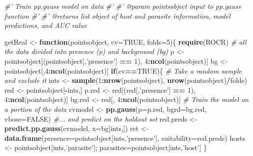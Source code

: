 \documentclass[
]{article}
\newenvironment{Shaded}{\begin{snugshade}}{\end{snugshade}}
\newcommand{\CommentTok}[1]{\textcolor[rgb]{0.56,0.35,0.01}{\textit{#1}}}
\newcommand{\ControlFlowTok}[1]{\textcolor[rgb]{0.13,0.29,0.53}{\textbf{#1}}}
\newcommand{\DataTypeTok}[1]{\textcolor[rgb]{0.13,0.29,0.53}{#1}}
\newcommand{\DecValTok}[1]{\textcolor[rgb]{0.00,0.00,0.81}{#1}}
\newcommand{\KeywordTok}[1]{\textcolor[rgb]{0.13,0.29,0.53}{\textbf{#1}}}
\newcommand{\NormalTok}[1]{#1}
\newcommand{\OperatorTok}[1]{\textcolor[rgb]{0.81,0.36,0.00}{\textbf{#1}}}
\newcommand{\OtherTok}[1]{\textcolor[rgb]{0.56,0.35,0.01}{#1}}
\newcommand{\StringTok}[1]{\textcolor[rgb]{0.31,0.60,0.02}{#1}}
\begin{document}
\begin{Shaded}
\begin{Highlighting}[]
\CommentTok{#' Train pp.gauss model on data}
\CommentTok{#'}
\CommentTok{#' @param pointsobject input to pp.gauss function}
\CommentTok{#' }
\CommentTok{#' @returns list object of host and parasite information, model predictions, and AUC value}

\NormalTok{getReal <-}\StringTok{ }\ControlFlowTok{function}\NormalTok{(pointsobject, }\DataTypeTok{cv=}\OtherTok{TRUE}\NormalTok{, }\DataTypeTok{folds=}\DecValTok{5}\NormalTok{)\{}
  \KeywordTok{require}\NormalTok{(ROCR)}
  \CommentTok{# all the data divided into presence (p) and background (bg)}
\NormalTok{  p <-}\StringTok{ }\NormalTok{pointsobject[(pointsobject[,}\StringTok{'presence'}\NormalTok{] }\OperatorTok{==}\StringTok{ }\DecValTok{1}\NormalTok{), }\DecValTok{4}\OperatorTok{:}\KeywordTok{ncol}\NormalTok{(pointsobject)]}
\NormalTok{  bg <-}\StringTok{ }\NormalTok{pointsobject[,}\DecValTok{4}\OperatorTok{:}\KeywordTok{ncol}\NormalTok{(pointsobject)]}
  \ControlFlowTok{if}\NormalTok{(cv}\OperatorTok{==}\OtherTok{TRUE}\NormalTok{)\{}
        \CommentTok{# Take a random sample and exclude it}
\NormalTok{        ints <-}\StringTok{ }\KeywordTok{sample}\NormalTok{(}\DecValTok{1}\OperatorTok{:}\KeywordTok{nrow}\NormalTok{(pointsobject), }\KeywordTok{nrow}\NormalTok{(pointsobject)}\OperatorTok{/}\NormalTok{folds)}
\NormalTok{        red <-}\StringTok{ }\NormalTok{pointsobject[}\OperatorTok{-}\NormalTok{ints,]}
\NormalTok{        p.red <-}\StringTok{ }\NormalTok{red[(red[,}\StringTok{'presence'}\NormalTok{] }\OperatorTok{==}\StringTok{ }\DecValTok{1}\NormalTok{), }\DecValTok{4}\OperatorTok{:}\KeywordTok{ncol}\NormalTok{(pointsobject)]}
\NormalTok{        bg.red <-}\StringTok{ }\NormalTok{red[, }\DecValTok{4}\OperatorTok{:}\KeywordTok{ncol}\NormalTok{(pointsobject)]}
        \CommentTok{# Train the model on a portion of the data}
\NormalTok{        cvmodel <-}\StringTok{ }\KeywordTok{pp.gauss}\NormalTok{(}\DataTypeTok{p=}\NormalTok{p.red, }\DataTypeTok{bgrd=}\NormalTok{bg.red, }\DataTypeTok{vbose=}\OtherTok{FALSE}\NormalTok{)}
        \CommentTok{#... and predict on the holdout set}
\NormalTok{        red.preds <-}\StringTok{ }\KeywordTok{predict.pp.gauss}\NormalTok{(cvmodel, }\DataTypeTok{x=}\NormalTok{bg[ints,])}
\NormalTok{        ret <-}\StringTok{ }\KeywordTok{data.frame}\NormalTok{(}\DataTypeTok{presence=}\NormalTok{pointsobject[ints,}\StringTok{'presence'}\NormalTok{], }\DataTypeTok{suitability=}\NormalTok{red.preds)}
\NormalTok{        hosts <-}\StringTok{ }\NormalTok{pointsobject[ints,}\StringTok{'parasite'}\NormalTok{]; parasites=pointsobject[ints,}\StringTok{'host'}\NormalTok{]}
\NormalTok{  \}}


\end{Highlighting}
\end{Shaded}
\end{document}
